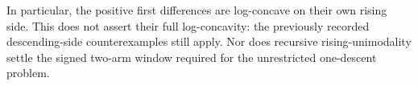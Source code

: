 In particular, the positive first differences are log-concave on
their own rising side. This does not assert their full log-concavity:
the previously recorded descending-side counterexamples still apply.
Nor does recursive rising-unimodality settle the signed two-arm
window required for the unrestricted one-descent problem.
